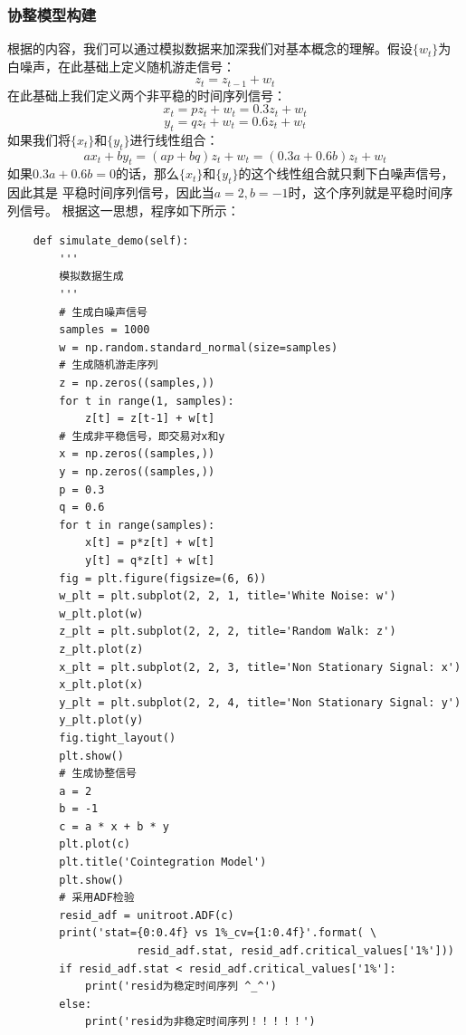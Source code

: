 \documentclass{article}
\begin{document}
\subsubsection{协整模型构建}
根据\cite{r000002}的内容，我们可以通过模拟数据来加深我们对基本概念的理解。假设$\{ w_{t} \}$为白噪声，在此基础上定义随机游走信号：
\begin{equation}
z_{t} = z_{t-1} + w_{t}
\label{e000058}
\end{equation}
在此基础上我们定义两个非平稳的时间序列信号：
\begin{equation}
x_{t} = pz_{t} + w_{t} = 0.3z_{t} + w_{t}
\label{e000059}
\end{equation}
\begin{equation}
y_{t} = qz_{t} + w_{t} = 0.6z_{t} + w_{t}
\label{e000060}
\end{equation}
如果我们将$\{ x_{t} \}$和$\{ y_{t} \}$进行线性组合：
\begin{equation}
ax_{t} + by_{t} = (ap+bq)z_{t} + w_{t} = (0.3a+0.6b)z_{t} + w_{t}
\label{e000061}
\end{equation}
如果$0.3a+0.6b=0$的话，那么$\{ x_{t} \}$和$\{ y_{t} \}$的这个线性组合就只剩下白噪声信号，因此其是
平稳时间序列信号，因此当$a=2, b=-1$时，这个序列就是平稳时间序列信号。\newline
根据这一思想，程序如下所示：
\begin{lstlisting}
    def simulate_demo(self):
        '''
        模拟数据生成
        '''
        # 生成白噪声信号
        samples = 1000
        w = np.random.standard_normal(size=samples)
        # 生成随机游走序列
        z = np.zeros((samples,))
        for t in range(1, samples):
            z[t] = z[t-1] + w[t]
        # 生成非平稳信号，即交易对x和y
        x = np.zeros((samples,))
        y = np.zeros((samples,))
        p = 0.3
        q = 0.6
        for t in range(samples):
            x[t] = p*z[t] + w[t]
            y[t] = q*z[t] + w[t]
        fig = plt.figure(figsize=(6, 6))
        w_plt = plt.subplot(2, 2, 1, title='White Noise: w')
        w_plt.plot(w)
        z_plt = plt.subplot(2, 2, 2, title='Random Walk: z')
        z_plt.plot(z)
        x_plt = plt.subplot(2, 2, 3, title='Non Stationary Signal: x')
        x_plt.plot(x)
        y_plt = plt.subplot(2, 2, 4, title='Non Stationary Signal: y')
        y_plt.plot(y)
        fig.tight_layout()
        plt.show()
        # 生成协整信号
        a = 2
        b = -1
        c = a * x + b * y
        plt.plot(c)
        plt.title('Cointegration Model')
        plt.show()
        # 采用ADF检验 
        resid_adf = unitroot.ADF(c)
        print('stat={0:0.4f} vs 1%_cv={1:0.4f}'.format( \
                    resid_adf.stat, resid_adf.critical_values['1%']))
        if resid_adf.stat < resid_adf.critical_values['1%']:
            print('resid为稳定时间序列 ^_^')
        else:
            print('resid为非稳定时间序列！！！！！')
\end{lstlisting}
\end{document}

